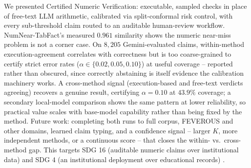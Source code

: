 \documentclass[journal]{IEEEtran}
\begin{document}
We presented Certified Numeric Verification: executable, sampled checks in
place of free-text LLM arithmetic, calibrated via split-conformal risk
control, with every sub-threshold claim routed to an auditable human-review
workflow. NumNear-TabFact's measured $0.961$ similarity shows the numeric
near-miss problem is not a corner case. On $8{,}205$ Gemini-evaluated
claims, within-method execution-agreement correlates with correctness but is
too coarse-grained to certify strict error rates
($\alpha\in\{0.02,0.05,0.10\}$) at useful coverage -- reported rather than
obscured, since correctly abstaining is itself evidence the calibration
machinery works. A cross-method signal (execution-based and free-text
verdicts agreeing) recovers a genuine result, certifying $\alpha=0.10$ at
$43.9\%$ coverage; a secondary local-model comparison shows the same pattern
at lower reliability, so practical value scales with base-model capability
rather than being fixed by the method. Future work: completing both runs to
full corpus, FEVEROUS and other domains, learned claim typing, and a
confidence signal -- larger $K$, more independent methods, or a continuous
score -- that closes the within- vs.\ cross-method gap. This targets SDG 16
(auditable numeric claims over institutional data) and SDG 4 (an
institutional deployment over educational records) \cite{un2015sdgs}.



\end{document}
